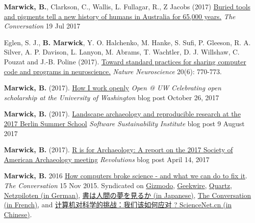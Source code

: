 \documentclass[11pt,article,oneside]{memoir}
\begin{document}
{{{\ind \textbf{Marwick, B.}, Clarkson, C., Wallis, L. Fullagar, R., Z Jacobs (2017) \href{https://theconversation.com/buried-tools-and-pigments-tell-a-new-history-of-humans-in-australia-for-65-000-years-81021}{Buried tools and pigments tell a new history of humans in Australia for 65,000 years.} \textit{The Conversation} 19 Jul 2017 

\ind Eglen, S. J., \textbf{B. Marwick}, Y. O. Halchenko, M. Hanke, S. Sufi, P. Gleeson, R. A. Silver, A. P. Davison, L. Lanyon, M. Abrams, T. Wachtler, D. J. Willshaw, C. Pouzat and J.-B. Poline (2017). \href{http://www.nature.com/neuro/journal/v20/n6/full/nn.4550.html}{Toward standard practices for sharing computer code and programs in neuroscience.} \textit{Nature Neuroscience} 20(6): 770-773.

\ind \textbf{Marwick, B.} (2017). \href{https://blogs.uw.edu/openpub/2017/10/26/how-i-work-open-ben-marwick/}{How I work openly} \textit{Open @ UW Celebrating open scholarship at the University of Washington} blog post October 26, 2017 

\ind \textbf{Marwick, B.} (2017). \href{https://www.software.ac.uk/blog/2017-08-09-landscape-archaeology-and-reproducible-research-2017-berlin-summer-school}{Landscape archaeology and reproducible research at the 2017 Berlin Summer School} \textit{Software Sustainability Institute} blog post 9 August 2017 

\ind \textbf{Marwick, B.} (2017). \href{http://blog.revolutionanalytics.com/2017/04/r-is-for-archaeology.html}{R is for Archaeology: A report on the 2017 Society of American Archaeology meeting} \textit{Revolutions} blog post April 14, 2017 

\ind \textbf{Marwick, B.} 2016 \href{https://theconversation.com/how-computers-broke-science-and-what-we-can-do-to-fix-it-49938}{How computers broke science - and what we can do to fix it}. \textit{The Conversation} 15 Nov 2015.  Syndicated on \href{http://gizmodo.com/how-computers-broke-science-and-what-we-can-do-to-fix-i-1741649207}{Gizmodo}, \href{http://www.geekwire.com/2015/how-computers-broke-science-and-what-we-can-do-to-fix-it/}{Geekwire}, \href{http://qz.com/548730/computers-are-making-science-extremely-challenging-for-scientists/}{Quartz}, \href{http://www.netzpiloten.de/wissenschaft-computer-reproduzierbarkeit-probleme/}{Netzpiloten (in German)}, \href{http://filled-with-deities.hatenablog.jp/entry/2015/11/17/202013}{書は人間の夢を見るか (in Japanese)}, \href{https://theconversation.com/les-ordinateurs-nuisent-gravement-a-la-science-mais-il-est-possible-dy-remedier-1-52024}{The Conversation (in French)}, and \href{http://news.sciencenet.cn/htmlnews/2017/8/385497.shtm}{计算机对科学的挑战：我们该如何应对 ? ScienceNet.cn (in Chinese)}.

}}}
\end{document}

